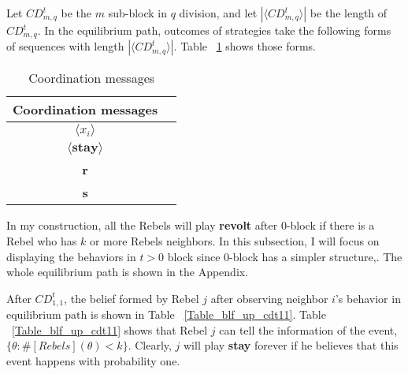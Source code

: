 \documentclass[12pt,letterpaper]{article}
\newtheorem*{main result}{Main Result}
\theoremstyle{definition}
\theoremstyle{remark}
\theoremstyle{claim}
\begin{document}
Let $CD^t_{m,q}$ be the $m$ sub-block in $q$ division, and let $|\langle CD^t_{m,q} \rangle|$ be the length of $CD^t_{m,q}$.  In the equilibrium path, outcomes of strategies take the following forms of sequences with length $|\langle CD^t_{m,q} \rangle|$. Table ~\ref{Table_msg_coordination} shows those forms.
\begin{table}[ht]
\caption{Coordination messages}
\label{Table_msg_coordination}
\begin{center}

\begin{tabular}{cc }
Coordination messages		&   \\
\hline
$\langle x_i \rangle$ 	& 	 \\
$\langle \textbf{stay} \rangle$	&   \\
\textbf{r}									& 	\\
\textbf{s}									& 	\\
\end{tabular}
\end{center}
\end{table}

In my construction, all the Rebels will play \textbf{revolt} after $0$-block if there is a Rebel who has $k$ or more Rebels neighbors. In this subsection, I will focus on displaying the behaviors in $t>0$ block since $0$-block has a simpler structure,. The whole equilibrium path is shown in the Appendix.

After $CD^t_{1,1}$, the belief formed by Rebel $j$ after observing neighbor $i$'s behavior in equilibrium path is shown in Table ~\ref{Table_blf_up_cdt11}. Table ~\ref{Table_blf_up_cdt11} shows that Rebel $j$ can tell the information of the event, $\{\theta:\#[Rebels](\theta)< k\}$. Clearly, $j$ will play \textbf{stay} forever if he believes that this event happens with probability one.
\end{document}

